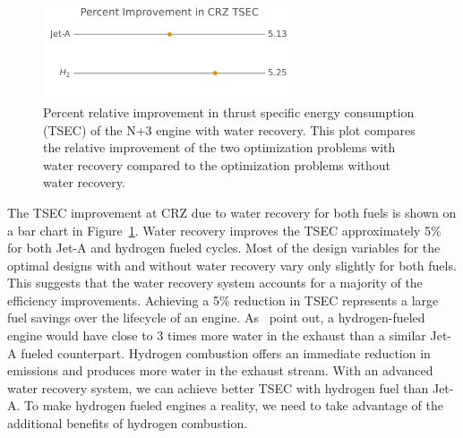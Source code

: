 \documentclass[conf]{new-aiaa}
\begin{document}
\begin{figure}[hbt!]
    \centering
    \includegraphics[width=0.65\textwidth]{bar_chart.pdf}
    \caption{Percent relative improvement in thrust specific energy consumption (TSEC) of the N+3 engine with water recovery.
        This plot compares the relative improvement of the two optimization problems with water recovery compared to the optimization problems without water recovery.}
    \label{fig:barchart}
\end{figure}

The TSEC improvement at CRZ due to water recovery for both fuels is shown on a bar chart in Figure~\ref{fig:barchart}.
Water recovery improves the TSEC approximately 5\% for both Jet-A and hydrogen fueled cycles.
Most of the design variables for the optimal designs with and without water recovery vary only slightly for both fuels.
This suggests that the water recovery system accounts for a majority of the efficiency improvements.
Achieving a 5\% reduction in TSEC represents a large fuel savings over the lifecycle of an engine.
As~\citeauthor{Strom2002} point out, a hydrogen-fueled engine would have close to 3 times more water in the exhaust than a similar Jet-A fueled counterpart.
Hydrogen combustion offers an immediate reduction in emissions and produces more water in the exhaust stream.
With an advanced water recovery system, we can achieve better TSEC with hydrogen fuel than Jet-A.
To make hydrogen fueled engines a reality, we need to take advantage of the additional benefits of hydrogen combustion.
\end{document}
